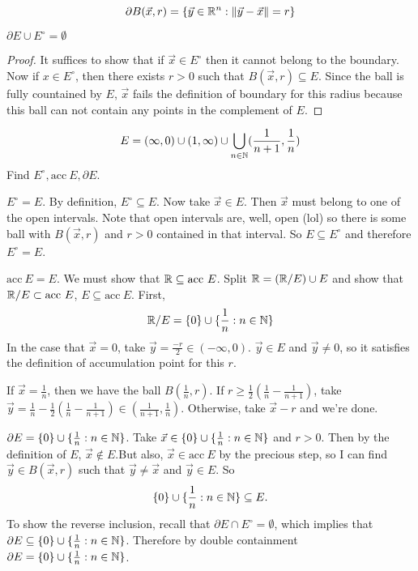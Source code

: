 \documentclass[11pt]{article}
\newcommand{\x}{\vec{x}}
\newcommand{\norm}[1]{\left\lVert #1 \right\rVert}
\newcommand{\y}{\vec{y}}
\begin{document}
\begin{example}
    \[\partial B(\x, r) = \{\y \in \R^n: \norm{\y-\x} = r\} \]
\end{example}

\begin{proposition}
    $\partial E \cup E^\circ = \emptyset$
    \begin{proof}
        It suffices to show that if $\x \in E^\circ$ then it cannot belong to the boundary. Now if $x \in E^\circ$, then there exists $r > 0$ such that $B(\x, r) \subseteq E$. Since the ball is fully countained by $E$, $\x$ fails the definition of boundary for this radius because this ball can not contain any points in the complement of $E$. 
    \end{proof}
\end{proposition}

\begin{example}
    \[E = (\infty, 0) \cup (1, \infty) \cup \bigcup_{n \in \mathbb{N}} (\frac{1}{n+1}, \frac{1}{n})\]
    Find $E^\circ, \text{acc} \ E, \partial E$. 
    \begin{solution}
        $E^\circ = E$. By definition, $E^\circ \subseteq E$. Now take $\x \in E$. Then $\x$ must belong to one of the open intervals. Note that open intervals are, well, open (lol) so there is some ball with $B(\x,r)$ and $r > 0$ contained in that interval. So $E \subseteq E^\circ$ and therefore $E^\circ = E$. \vspace{3mm}

        $\text{acc} \ E = E$. We must show that $\R \subseteq \text{acc} \ E$. Split $\mathbb{R} = (\mathbb{R} / E) \cup E$ and show that $\R / E \subset \text{acc} \ E$, $E \subseteq \text{acc} \ E$. First, \[\mathbb{R} / E = \{0\} \cup \{\frac{1}{n}: n \in \mathbb{N}\}\]
        In the case that $\x = 0$, take $\y = \frac{-r}{2} \in (-\infty, 0)$. $\y \in E$ and $\y \neq 0$, so it satisfies the definition of accumulation point for this $r$. \vspace{3mm} 

        If $\x = \frac{1}{n}$, then we have the ball $B(\frac{1}{n}, r)$. If $r \geq \frac{1}{2}(\frac{1}{n}-\frac{1}{n+1})$, take $\y = \frac{1}{n}- \frac{1}{2}(\frac{1}{n}-\frac{1}{n+1}) \in  (\frac{1}{n+1}, \frac{1}{n}).$ Otherwise, take $\x-r$ and we're done. \vspace{3mm} 

        $\partial E = \{0\} \cup \{\frac{1}{n}: n \in \mathbb{N}\}$. Take $\x \in \{0\} \cup \{\frac{1}{n}: n \in \N\}$ and $r > 0$. Then by the definition of $E$, $\x \not\in E$.But also, $\x \in \text{acc} \ E$ by the precious step, so I can find $\y \in B(\x,r)$ such that $\y \neq \x$ and $\y \in E$. So \[\{0\} \cup \{\frac{1}{n}: n \in \mathbb{N}\} \subseteq E.\]
        To show the reverse inclusion, recall that $\partial E \cap E^\circ = \emptyset$, which implies that $\partial E \subseteq \{0\} \cup \{\frac{1}{n}: n \in \mathbb{N}\}$. Therefore by double containment $\partial E = \{0\} \cup \{\frac{1}{n}: n \in \mathbb{N}\}$. 

    \end{solution}
\end{example}
\end{document}
